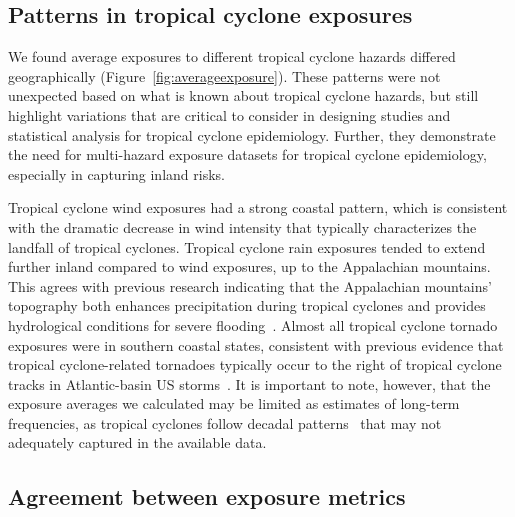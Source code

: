 \subsection*{Patterns in tropical cyclone exposures}

We found average exposures to different tropical cyclone hazards differed
geographically (Figure~\ref{fig:averageexposure}). These patterns were not
unexpected based on what is known about tropical cyclone hazards, but still
highlight variations that are critical to consider in designing studies and
statistical analysis for tropical cyclone epidemiology. Further, they
demonstrate the need for multi-hazard exposure datasets for tropical cyclone
epidemiology, especially in capturing inland risks. 

Tropical cyclone wind exposures had a strong coastal pattern, which is
consistent with the dramatic decrease in wind intensity that typically
characterizes the landfall of tropical cyclones.  Tropical cyclone rain
exposures tended to extend further inland compared to wind exposures, up to
the Appalachian mountains. This agrees with previous research indicating that
the Appalachian mountains' topography both enhances precipitation during
tropical cyclones and provides hydrological conditions for severe
flooding~\parencite{rees2001}.  Almost all tropical cyclone tornado exposures
were in southern coastal states, consistent with previous evidence that
tropical cyclone-related tornadoes typically occur to the right of tropical
cyclone tracks in Atlantic-basin \ac{US} storms~\parencite{moore2012}.  It is
important to note, however, that the exposure averages we calculated may be
limited as estimates of long-term frequencies, as tropical cyclones follow
decadal patterns~\parencite{kossin2007more} that may not adequately captured in
the available data. 

\subsection*{Agreement between exposure metrics}


